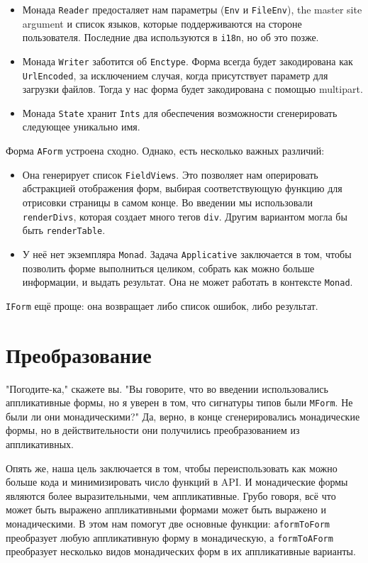 \begin{itemize}
\item Монада \lstinline'Reader' предосталяет нам параметры (\lstinline'Env' и 
\lstinline'FileEnv'), the master site argument и список языков, 
которые поддерживаются на
стороне пользователя. Последние два используются в \lstinline'i18n', но об это позже.

\item Монада \lstinline'Writer' заботится об \lstinline'Enctype'. Форма всегда будет 
закодирована как  \lstinline'UrlEncoded', за исключением случая, когда присутствует
параметр для загрузки файлов. Тогда у нас форма будет закодирована с помощью multipart.
\item Монада \lstinline'State' хранит \lstinline'Ints' для обеспечения возможности
сгенерировать следующее уникально имя.
\end{itemize}
Форма \lstinline'AForm' устроена сходно. Однако, есть несколько важных различий:
\begin{itemize}
\item Она генерирует список \lstinline'FieldViews'. Это позволяет нам оперировать
абстракцией отображения форм, выбирая соответствующую функцию для отрисовки страницы в
самом конце. Во введении мы использовали \lstinline'renderDivs', которая создает
много тегов \lstinline'div'. Другим вариантом могла бы быть 
\lstinline'renderTable'.

\item У неё нет экземпляра \lstinline'Monad'. Задача \lstinline'Applicative' заключается
в том, чтобы позволить форме выполниться целиком, собрать как можно больше информации, и
выдать результат. Она не может работать в контексте \lstinline'Monad'.
\end{itemize}
\lstinline'IForm' ещё проще: она возвращает либо список ошибок, либо результат.

\section{Преобразование}
"Погодите-ка," скажете вы. "Вы говорите, что во введении использовались аппликативные
формы, но я уверен в том, что сигнатуры типов были \lstinline'MForm'. Не были ли
они монадическими?" Да, верно, в конце сгенерировались монадические формы, но в
действительности они получились преобразованием из аппликативных.

Опять же, наша цель заключается в том, чтобы переиспользовать как можно больше кода и
минимизировать число функций в API. И монадические формы являются более
выразительными, чем аппликативные. Грубо говоря, всё что может быть выражено
аппликативными формами может быть выражено и монадическими. В этом нам помогут две
основные функции: \lstinline'aformToForm' преобразует любую аппликативную форму в
монадическую, а \lstinline'formToAForm' преобразует несколько видов монадических форм в их
аппликативные варианты.

